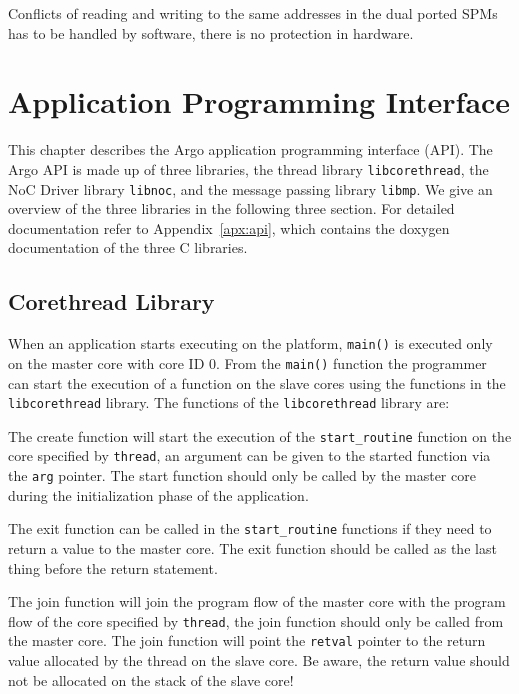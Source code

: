 \documentclass[a4paper,fontsize=10pt,twoside,DIV15,BCOR12mm,headinclude=true,footinclude=false,pagesize,bibtotoc]{scrbook}
\newcommand{\code}[1]{{\texttt{#1}}}
\renewenvironment{description}%
{
\begin{basedescript}{
\desclabelstyle{\nextlinelabel}
\renewcommand{\makelabel}[1]{%
\parbox[b]{\textwidth}{\bfseries##1}%
}%
\desclabelwidth{2em}}}
{
\end{basedescript}
}
\begin{document}
Conflicts of reading and writing to the same addresses in the dual
ported SPMs has to be handled by software, there is no protection in hardware.


\chapter{Application Programming Interface}
\label{chap:api}
This chapter describes the Argo application programming interface (API).
The Argo API is made up of three libraries, the thread library \code{libcorethread}, the NoC Driver library \code{libnoc}, and the message passing library \code{libmp}. We give an overview of the three libraries in the following three section.
For detailed documentation refer to Appendix~\ref{apx:api}, which contains the doxygen documentation of the three C libraries.

\section{Corethread Library}
\label{sec:cthread}
When an application starts executing on the platform, \code{main()} is executed only on the master core with core ID 0.
From the \code{main()} function the programmer can start the execution of a function on the slave cores using the functions in the \code{libcorethread} library.
The functions of the \code{libcorethread} library are:
\begin{description}
\item[\code{int corethread\_create( corethread\_t *thread, void(*start\_routine)(void *), void *arg ) )}]

The create function will start the execution of the \code{start\_routine} function on the core specified by \code{thread}, an argument can be given to the started function via the \code{arg} pointer. The start function should only be called by the master core during the initialization phase of the application.

\item[\code{void corethread\_exit( void * retval )}]

The exit function can be called in the \code{start\_routine} functions if they need to return a value to the master core.
The exit function should be called as the last thing before the return statement.

\item[\code{int corethread\_join( corethread\_t thread, void ** retval )}]

The join function will join the program flow of the master core with the program flow of the core specified by \code{thread}, the join function should only be called from the master core. The join function will point the \code{retval} pointer to the return value allocated by the thread on the slave core. Be aware, the return value should not be allocated on the stack of the slave core!

\end{description}
\end{document}
